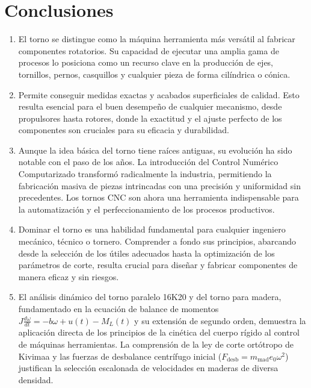 \documentclass[12pt,a4paper]{article}
\begin{document}
\clearpage
\vspace{4pt}
\noindent{\color{utablue!30}\rule{\textwidth}{0.5pt}}
\vspace{2pt}
\section{Conclusiones}
\label{sec:conclusiones}

\begin{enumerate}[itemsep=4pt, topsep=3pt, parsep=0pt]
    \item El torno se distingue como la máquina herramienta más versátil al fabricar componentes rotatorios. Su capacidad de ejecutar una amplia gama de procesos lo posiciona como un recurso clave en la producción de ejes, tornillos, pernos, casquillos y cualquier pieza de forma cilíndrica o cónica.

    \item Permite conseguir medidas exactas y acabados superficiales de calidad. Esto resulta esencial para el buen desempeño de cualquier mecanismo, desde propulsores hasta rotores, donde la exactitud y el ajuste perfecto de los componentes son cruciales para su eficacia y durabilidad.

    \item Aunque la idea básica del torno tiene raíces antiguas, su evolución ha sido notable con el paso de los años. La introducción del Control Numérico Computarizado transformó radicalmente la industria, permitiendo la fabricación masiva de piezas intrincadas con una precisión y uniformidad sin precedentes. Los tornos CNC son ahora una herramienta indispensable para la automatización y el perfeccionamiento de los procesos productivos.

    \item Dominar el torno es una habilidad fundamental para cualquier ingeniero mecánico, técnico o tornero. Comprender a fondo sus principios, abarcando desde la selección de los útiles adecuados hasta la optimización de los parámetros de corte, resulta crucial para diseñar y fabricar componentes de manera eficaz y sin riesgos.

    \item El análisis dinámico del torno paralelo 16K20 y del torno para madera, fundamentado en la ecuación de balance de momentos $J\frac{d\omega}{dt} = -b\omega + u(t) - M_L(t)$ y su extensión de segundo orden, demuestra la aplicación directa de los principios de la cinética del cuerpo rígido al control de máquinas herramientas. La comprensión de la ley de corte ortótropo de Kivimaa y las fuerzas de desbalance centrífugo inicial ($F_{\text{desb}} = m_{\text{mad}} e_0 \omega^2$) justifican la selección escalonada de velocidades en maderas de diversa densidad.


\end{enumerate}
\end{document}
